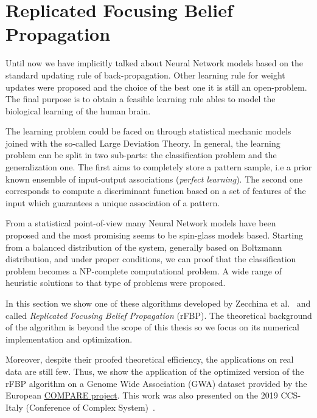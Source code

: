 \documentclass{standalone}
\begin{document}
\section[rFBP]{Replicated Focusing Belief Propagation}\label{rfbp:rfbp}

Until now we have implicitly talked about Neural Network models based on the standard updating rule of back-propagation.
Other learning rule for weight updates were proposed and the choice of the best one it is still an open-problem.
The final purpose is to obtain a feasible learning rule ables to model the biological learning of the human brain.

The learning problem could be faced on through statistical mechanic models joined with the so-called Large Deviation Theory.
In general, the learning problem can be split in two sub-parts: the classification problem and the generalization one.
The first aims to completely store a pattern sample, i.e a prior known ensemble of input-output associations (\emph{perfect learning}).
The second one corresponds to compute a discriminant function based on a set of features of the input which guarantees a unique association of a pattern.

From a statistical point-of-view many Neural Network models have been proposed and the most promising seems to be spin-glass models based.
Starting from a balanced distribution of the system, generally based on Boltzmann distribution, and under proper conditions, we can proof that the classification problem becomes a NP-complete computational problem.
A wide range of heuristic solutions to that type of problems were proposed.

In this section we show one of these algorithms developed by Zecchina et al.~\cite{BaldassiE7655} and called \emph{Replicated Focusing Belief Propagation} (rFBP).
The theoretical background of the algorithm is beyond the scope of this thesis so we focus on its numerical implementation and optimization.

Moreover, despite their proofed theoretical efficiency, the applications on real data are still few.
Thus, we show the application of the optimized version of the rFBP algorithm on a Genome Wide Association (GWA) dataset provided by the European \href{https://www.compare-europe.eu/}{COMPARE project}.
This work was also presented on the 2019 CCS-Italy (Conference of Complex System)~\cite{DallOlioCCS19}.
\end{document}
